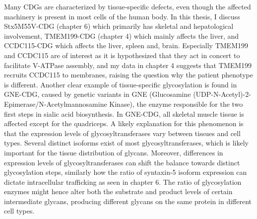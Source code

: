 Many CDGs are characterized by tissue-specific defects, even though the affected machinery is present in most cells of the human body. In this thesis, I discuss Stx5M55V-CDG (chapter 6) which primarily has skeletal and hepatological involvement, TMEM199-CDG (chapter 4) which mainly affects the liver\cite{jansen_tmem199_2016}, and CCDC115-CDG\cite{jansen_ccdc115_2016} which affects the liver, spleen and, brain. Especially TMEM199 and CCDC115 are of interest as it is hypothesized that they act in concert to facilitate V-ATPase assembly\cite{miles_vacuolar-atpase_2017}, and my data in chapter 4 suggests that TMEM199 recruits CCDC115 to membranes, raising the question why the patient phenotype is different. Another clear example of tissue-specific glycosylation is found in GNE-CDG, caused by genetic variants in GNE (Glucosamine (UDP-N-Acetyl)-2-Epimerase/N-Acetylmannosamine Kinase), the enzyme responsible for the two first steps in sialic acid biosynthesis\cite{argov_rimmed_1984,broccolini_hereditary_2011,brasil_cdg_2018,voermans_clinical_2010,willems_genetic_2016}. In GNE-CDG, all skeletal muscle tissue is affected except for the quadriceps. A likely explanation for this phenomenon is that the expression levels of glycosyltransferases vary between tissues and cell types\cite{linders_sugary_2020,papanikou_yeast_2009,mogelsvang_predicting_2004,nilsson_overlapping_1993,ripoche_location_1994,velasco_cell_1993,nairn_regulation_2008}. Several distinct isoforms exist of most glycosyltransferases\cite{moremen_vertebrate_2012}, which is likely important for the tissue distribution of glycans. Moreover, differences in expression levels of glycosyltransferases can shift the balance towards distinct glycosylation steps, similarly how the ratio of syntaxin-5 isoform expression can dictate intracellular trafficking as seen in chapter 6. The ratio of glycosylation enzymes might hence alter both the substrate and product levels of certain intermediate glycans, producing different glycans on the same protein in different cell types.

